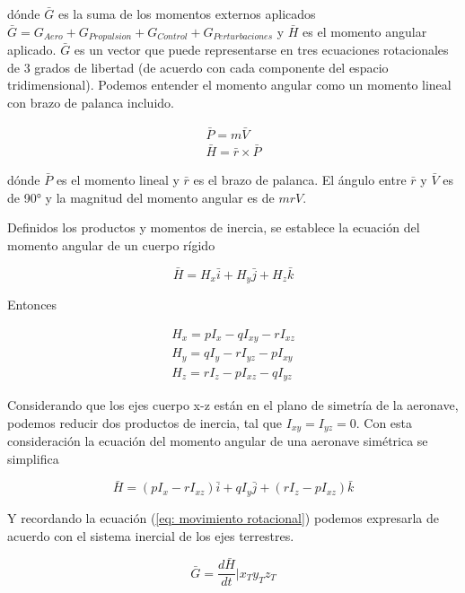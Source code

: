 dónde $\bar{G}$ es la suma de los momentos externos aplicados $\bar{G}=G_{Aero}+G_{Propulsion}+G_{Control}+G_{Perturbaciones}$ y $\bar{H}$ es el momento angular aplicado. 
$\bar{G}$ es un vector que puede representarse en tres ecuaciones rotacionales de 3 grados de libertad (de acuerdo con cada componente del espacio tridimensional). 
Podemos entender el momento angular como un momento lineal con brazo de palanca incluido. 

\begin{gather}
    \bar{P} = m\bar{V} \\
    \bar{H} = \bar{r} \times \bar{P}
\end{gather}

dónde $\bar{P}$ es el momento lineal y  $\bar{r}$ es el brazo de palanca. El ángulo entre $\bar{r}$ y $\bar{V}$ es de 90° y la magnitud del momento angular es de $mrV$. 

Definidos los productos y momentos de inercia, se establece la ecuación del momento angular de un cuerpo rígido 

\begin{equation}
    \bar{H} = H_x \bar{i} + H_y \bar{j} + H_z \bar{k}
\end{equation}

Entonces

\begin{gather}
    H_x = p I_{x} - q I_{xy} - r I_{xz} \\
    H_y = q I_{y} - r I_{yz} - p I_{xy} \\
    H_z = r I_{z} - p I_{xz} - q I_{yz}
\end{gather}


Considerando que los ejes cuerpo x-z están en el plano de simetría de la aeronave, podemos reducir dos productos de inercia, tal que $I_{xy} = I_{yz} = 0$. 
Con esta consideración la ecuación del momento angular de una aeronave simétrica se simplifica

\begin{equation}
    \bar{H} = (p I_{x} - r I_{xz})\bar{i} + q I_{y}\bar{j} + (r I_{z} - p I_{xz})\bar{k} 
\end{equation}

Y recordando la ecuación (\ref{eq: movimiento rotacional}) podemos expresarla de acuerdo con el sistema inercial de los ejes terrestres. 

\begin{equation}
    \bar{G} = \frac{d\bar{H}}{dt} | x_T y_T z_T
\end{equation}

